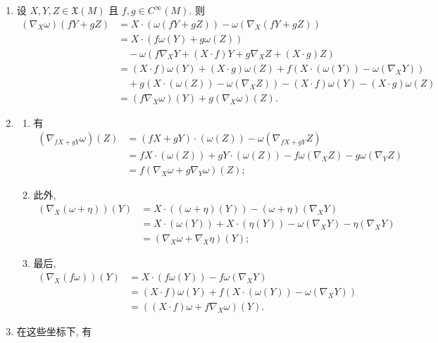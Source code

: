 \begin{description}[font=\normalfont,leftmargin=2em,labelwidth=1.5em]
\begin{enumerate}[label=(\alph*),ref=\alph*,leftmargin=*]
\item 设 $X,Y,Z\in\mathfrak X(M)$ 且 $f,g\in C^\infty(M)$. 则
\begin{align*}
  (\nabla_X\omega)(fY+gZ)
  &=X\cdot(\omega(fY+gZ))-\omega(\nabla_X(fY+gZ))\\
  &=X\cdot(f\omega(Y)+g\omega(Z))\\
  &\quad-\omega(f\nabla_XY+(X\cdot f)Y+g\nabla_XZ+(X\cdot g)Z)\\
  &=(X\cdot f)\omega(Y)+(X\cdot g)\omega(Z)+f(X\cdot(\omega(Y))-\omega(\nabla_XY))\\
  &\quad+g(X\cdot(\omega(Z))-\omega(\nabla_XZ))-(X\cdot f)\omega(Y)-(X\cdot g)\omega(Z)\\
  &=(f\nabla_X\omega)(Y)+g(\nabla_X\omega)(Z).
\end{align*}
\item
\begin{enumerate}[label=(\roman*),ref=\roman*,leftmargin=*]
\item 有
\begin{align*}
  (\nabla_{fX+gY}\omega)(Z)&=(fX+gY)\cdot(\omega(Z))-\omega(\nabla_{fX+gY}Z)\\
  &=fX\cdot(\omega(Z))+gY\cdot(\omega(Z))-f\omega(\nabla_X Z)-g\omega(\nabla_Y Z)\\
  &=f(\nabla_X\omega+g\nabla_Y\omega)(Z);
\end{align*}
\item 此外,
\begin{align*}
  (\nabla_X(\omega+\eta))(Y)
  &=X\cdot((\omega+\eta)(Y))-(\omega+\eta)(\nabla_XY)\\
  &=X\cdot(\omega(Y))+X\cdot(\eta(Y))-\omega(\nabla_XY)-\eta(\nabla_XY)\\
  &=(\nabla_X\omega+\nabla_X\eta)(Y);
\end{align*}
\item 最后,
\begin{align*}
  (\nabla_X(f\omega))(Y)
  &=X\cdot(f\omega(Y))-f\omega(\nabla_XY)\\
  &=(X\cdot f)\omega(Y)+f(X\cdot(\omega(Y))-\omega(\nabla_XY))\\
  &=((X\cdot f)\omega+f\nabla_X\omega)(Y).
\end{align*}
\end{enumerate}
\item 在这些坐标下, 有
\begin{align*}

\end{align*}
\end{enumerate}
\end{description}
